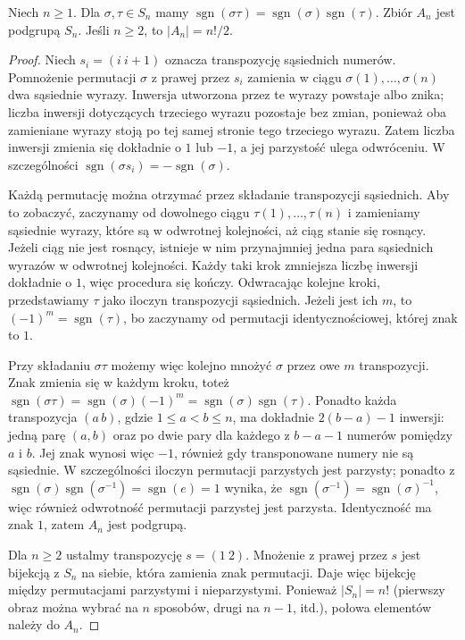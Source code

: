 \begin{lemat}
\label{aa:lem:znak}
Niech $n\ge1$. Dla $\sigma,\tau\in S_n$ mamy
$\operatorname{sgn}(\sigma\tau)
=\operatorname{sgn}(\sigma)\operatorname{sgn}(\tau)$.
Zbiór $A_n$ jest podgrupą $S_n$. Jeśli $n\ge2$,
to $|A_n|=n!/2$.
\end{lemat}
\begin{proof}
Niech $s_i=(i\ i+1)$ oznacza transpozycję sąsiednich
numerów. Pomnożenie permutacji $\sigma$ z prawej przez $s_i$
zamienia w ciągu $\sigma(1),\ldots,\sigma(n)$ dwa sąsiednie
wyrazy. Inwersja utworzona przez te wyrazy powstaje albo znika;
liczba inwersji dotyczących trzeciego wyrazu pozostaje bez zmian,
ponieważ oba zamieniane wyrazy stoją po tej samej stronie tego
trzeciego wyrazu. Zatem liczba inwersji zmienia się dokładnie o $1$
lub $-1$, a jej parzystość ulega odwróceniu. W szczególności
$\operatorname{sgn}(\sigma s_i)=-\operatorname{sgn}(\sigma)$.

Każdą permutację można otrzymać przez składanie transpozycji
sąsiednich. Aby to zobaczyć, zaczynamy od dowolnego ciągu
$\tau(1),\ldots,\tau(n)$ i zamieniamy sąsiednie wyrazy,
które są w odwrotnej kolejności, aż ciąg stanie się rosnący.
Jeżeli ciąg nie jest rosnący, istnieje w nim przynajmniej jedna
para sąsiednich wyrazów w odwrotnej kolejności.
Każdy taki krok zmniejsza liczbę inwersji dokładnie o $1$,
więc procedura się kończy. Odwracając kolejne kroki,
przedstawiamy $\tau$ jako iloczyn transpozycji sąsiednich.
Jeżeli jest ich $m$, to $(-1)^m=\operatorname{sgn}(\tau)$,
bo zaczynamy od permutacji identycznościowej, której znak to $1$.

Przy składaniu $\sigma\tau$ możemy więc kolejno mnożyć
$\sigma$ przez owe $m$ transpozycji. Znak zmienia się w każdym
kroku, toteż
$\operatorname{sgn}(\sigma\tau)
=\operatorname{sgn}(\sigma)(-1)^m
=\operatorname{sgn}(\sigma)\operatorname{sgn}(\tau)$.
Ponadto każda transpozycja $(a\,b)$, gdzie $1\le a<b\le n$,
ma dokładnie $2(b-a)-1$ inwersji: jedną parę $(a,b)$ oraz
po dwie pary dla każdego z $b-a-1$ numerów pomiędzy $a$ i $b$.
Jej znak wynosi więc $-1$, również gdy transponowane numery
nie są sąsiednie.
W szczególności iloczyn permutacji parzystych jest parzysty;
ponadto z $\operatorname{sgn}(\sigma)\operatorname{sgn}(\sigma^{-1})=\operatorname{sgn}(e)=1$ wynika, że $\operatorname{sgn}(\sigma^{-1})=\operatorname{sgn}(\sigma)^{-1}$,
więc również odwrotność permutacji parzystej jest parzysta.
Identyczność ma znak $1$, zatem $A_n$ jest podgrupą.

Dla $n\ge2$ ustalmy transpozycję $s=(1\ 2)$.
Mnożenie z prawej przez $s$ jest bijekcją z $S_n$ na siebie,
która zamienia znak permutacji. Daje więc bijekcję
między permutacjami parzystymi i nieparzystymi.
Ponieważ $|S_n|=n!$ (pierwszy obraz można wybrać na $n$
sposobów, drugi na $n-1$, itd.), połowa elementów należy do $A_n$.
\end{proof}

